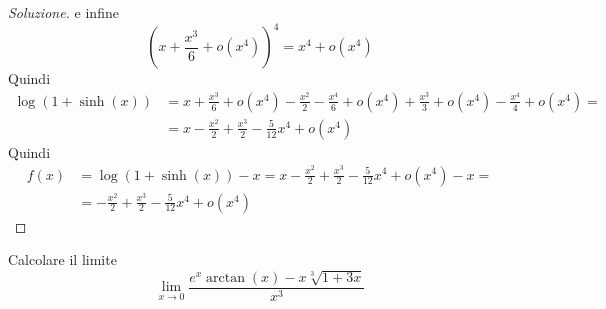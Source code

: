 \begin{proof}[Soluzione]
    e infine 
    \[
        \left(x+\frac{x^3}{6}+o(x^4)\right)^4= x^4 +o(x^4)
    \]
    Quindi
    \[
    \begin{split}
        \log(1+\sinh(x))& = x +\frac{x^3}{6}+o(x^4) -\frac{x^2}{2}-\frac{x^4}{6} +o(x^4)+\frac{x^3}{3}+o(x^4)-\frac{x^4}{4}+o(x^4) = \\
        & = x -\frac{x^2}{2} +\frac{x^3}{2}-\frac{5}{12}x^4 +o(x^4)
    \end{split} 
    \]
    Quindi
    \[
    \begin{split}
        f(x) & = \log(1+\sinh(x))-x = x -\frac{x^2}{2} +\frac{x^3}{2}-\frac{5}{12}x^4 +o(x^4) -x = \\
        & = -\frac{x^2}{2} +\frac{x^3}{2}-\frac{5}{12}x^4 +o(x^4)
    \end{split}
    \]
\end{proof}
\begin{exercise}
    \label{ex:6.6}
    Calcolare il limite
    \[
    \lim_{x\to 0}\frac{e^x\arctan(x)-x\sqrt[3]{1+3x}}{x^3}
    \]
\end{exercise}
